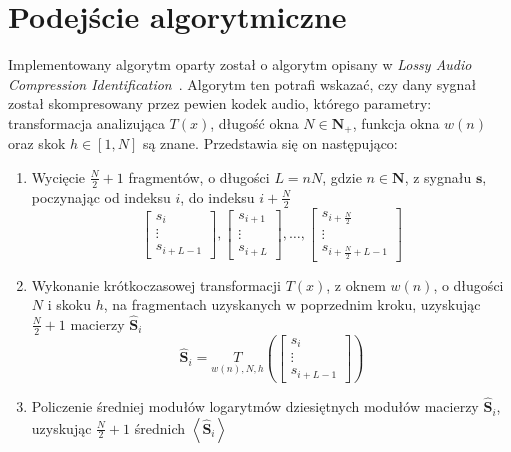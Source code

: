 \documentclass[pl,12pt]{aghdpl}
\let\Oldsection\section%
\renewcommand{\section}{\FloatBarrier\Oldsection}
\begin{document}
\section{Podejście algorytmiczne}
Implementowany algorytm oparty został o algorytm opisany w
\textit{Lossy Audio Compression Identification}~\cite{KimRafii2018}. Algorytm
ten potrafi wskazać, czy dany sygnał został skompresowany przez pewien kodek
audio, którego parametry: transformacja analizująca $T(x)$, długość okna $N \in
\bm N_+$, funkcja okna $w(n)$ oraz skok $h \in \left[1, N\right]$ są znane.
Przedstawia się on następująco:
\begin{enumerate}
  \item Wycięcie $\frac{N}{2}+1$ fragmentów, o długości $L = nN$, gdzie $n \in
    \bm N$, z sygnału $\bm s$,
    poczynając od indeksu $i$, do indeksu $i+\frac{N}{2}$
    \begin{equation}
      \begin{bmatrix}
        s_i \\\vdots\\ s_{i+L-1}
      \end{bmatrix},
      \begin{bmatrix}
        s_{i+1} \\\vdots\\ s_{i+L}
      \end{bmatrix}, \dotsc,
      \begin{bmatrix}
        s_{i+\frac{N}{2}} \\\vdots\\ s_{i+\frac{N}{2}+L-1}
      \end{bmatrix}
    \end{equation}
  \item Wykonanie krótkoczasowej transformacji $T(x)$, z oknem $w(n)$, o długości
    $N$ i skoku $h$, na fragmentach uzyskanych w poprzednim kroku, uzyskując
    $\frac{N}{2}+1$ macierzy $\hat{\bm S}_i$
    \begin{equation}
      \hat{\bm S}_i = \underset{w(n), N, h}{T}\left(
        \begin{bmatrix}
          s_i \\\vdots\\ s_{i+L-1}
        \end{bmatrix}\right)
    \end{equation}
  \item Policzenie średniej modułów logarytmów dziesiętnych modułów macierzy
    $\hat{\bm S}_i$, uzyskując $\frac{N}{2}+1$ średnich $\left<\hat{\bm S}_i\right>$
    \begin{equation}

\end{equation}
\end{enumerate}
\end{document}
